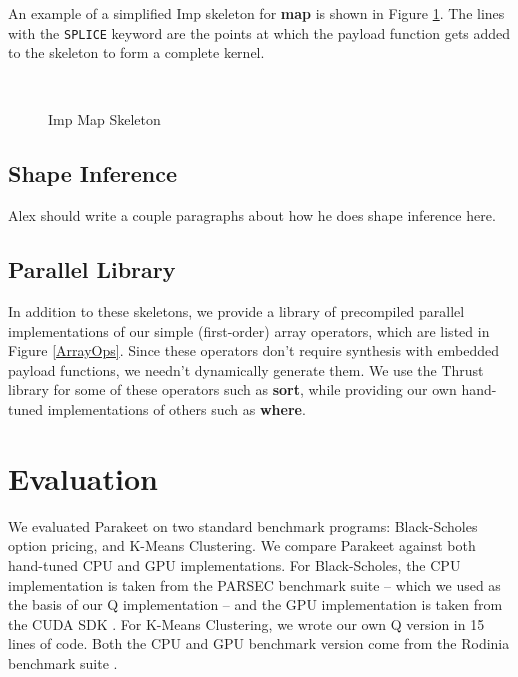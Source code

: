 \documentclass[preprint]{sigplanconf}
\begin{document}
An example of a simplified Imp skeleton for \textbf{map} is shown in Figure \ref{ImpMap}.  The lines with the \texttt{SPLICE} keyword are the points at which the payload function gets added to the skeleton to form a complete kernel.

\begin{figure}[h!]
  \begin{lstlisting}[numbers=none]
    
  \end{lstlisting}
  \caption{Imp Map Skeleton}
  \label{ImpMap}
\end{figure}

\subsection{Shape Inference}
\label{shapeinference}

Alex should write a couple paragraphs about how he does shape inference here.

\subsection{Parallel Library}

In addition to these skeletons, we provide a library of precompiled parallel implementations of our simple (first-order) array operators, which are listed in Figure \ref{ArrayOps}.  Since these operators don't require synthesis with embedded payload functions, we needn't dynamically generate them.  We use the Thrust library \cite{Hobe10} for some of these operators such as \textbf{sort}, while providing our own hand-tuned implementations of others such as \textbf{where}.

\section{Evaluation}
\label{Evaluation}

We evaluated Parakeet on two standard benchmark programs: Black-Scholes option pricing, and K-Means Clustering.  We compare Parakeet against both hand-tuned CPU and GPU implementations.  For Black-Scholes, the CPU implementation is taken from the PARSEC \cite{Bien08} benchmark suite -- which we used as the basis
of our Q implementation -- and the GPU implementation is taken from the CUDA SDK \cite{NvidSD}.  For K-Means Clustering, we wrote our own Q version in 15 lines of code.  Both the CPU and GPU benchmark version come from the Rodinia benchmark suite \cite{Che09}.
\end{document}
